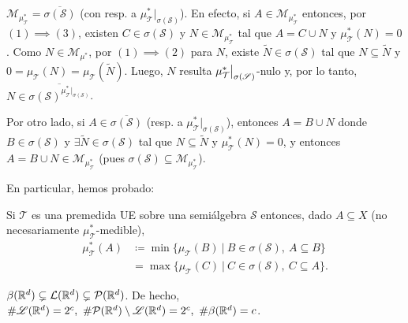 \begin{observe}
	$\mathscr{M}_{\mu_{\mathcal{T}}^{*}} = \overline{\sigma(\mathscr{S})}$ (con resp. a $\mu_{\mathcal{T}}^{*}|_{\sigma(\mathscr{S})}$). En efecto, si $A \in \mathscr{M}_{\mu_{\mathcal{T}}^{*}}$ entonces, por $(1) \implies (3)$, existen $C \in \sigma(\mathscr{S})$ y $N \in \mathscr{M}_{\mu_{\mathcal{T}}^{*}}$ tal que $A = C \cup N$ y $\mu_{\mathcal{T}}^{*}(N) = 0$. Como $N \in \mathscr{M}_{\mu^{*}}$, por $(1) \implies (2)$ para $N$, existe $\widetilde{N} \in \sigma(\mathscr{S})$ tal que $N \subseteq \widetilde{N}$ y $0 = \mu_{\mathcal{T}}(N) = \mu_{\mathcal{T}}(\widetilde{N})$. Luego, $N$ resulta $\mu_{\mathcal{T}}^{*}\big{|}_{\sigma(\mathscr{S})}$-nulo y, por lo tanto, $N \in \overline{\sigma(\mathscr{S})^{\mu_{\mathcal{T}}^{*}|_{\sigma(\mathscr{S})}}}$. \newline

	\noindent Por otro lado, si $A \in \overline{\sigma(\mathscr{S})}$ (resp. a $\mu_{\mathcal{T}}^{*}|_{\sigma(\mathscr{S})}$), entonces $A = B \cup N$ donde $B \in \sigma(\mathscr{S})$ y $\exists \widetilde{N} \in \sigma(\mathscr{S})$ tal que $N \subseteq \widetilde{N}$ y $\mu_{\mathcal{T}}^{*}(N) = 0$, y entonces $A = B \cup N \in \mathscr{M}_{\mu_{\mathcal{T}}^{*}}$ (pues $\sigma(\mathscr{S}) \subseteq \mathscr{M}_{\mu_{\mathcal{T}}^{*}}$).
\end{observe}

\begin{observe}
	En particular, hemos probado:
\end{observe}

\begin{prop}
	Si $\mathcal{T}$ es una premedida UE sobre una semiálgebra $\mathscr{S}$ entonces, dado $A \subseteq X$ (no necesariamente $\mu_{\mathcal{T}}^{*}$-medible),
	\begin{align*}
		\mu_{\mathcal{T}}^{*}(A) & \coloneq \min \{ \mu_{\mathcal{T}}(B) \ \big| \ B \in \sigma(\mathscr{S}),\ A \subseteq B \} \\
		& = \max \{ \mu_{\mathcal{T}}(C) \ \big| \ C \in \sigma(\mathscr{S}),\ C \subseteq A \}  
	.\end{align*}
\end{prop}

\begin{theorem}
	$\beta(\mathbb{R}^d) \subsetneq \mathcal{L}(\mathbb{R}^d) \subsetneq \mathcal{P}(\mathbb{R}^d)$. De hecho, $\# \mathscr{L}(\mathbb{R}^d) = 2^c,\ \# \mathcal{P}(\mathbb{R}^d) \setminus \mathscr{L}(\mathbb{R}^d) = 2^c,\ \# \beta(\mathbb{R}^d) = c$.
\end{theorem}

